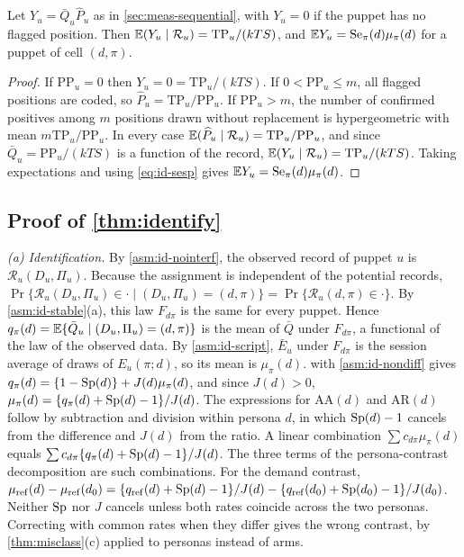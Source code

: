 \begin{lemma}\label{lem:seq-unbiased}
Let $Y_u=\bar Q_u\widehat P_u$ as in \cref{sec:meas-sequential}, with $Y_u=0$ if the puppet has no flagged position. Then $\mathbb{E}(Y_u\mid\mathcal R_u)=\mathrm{TP}_u/(kTS)$, and $\mathbb{E} Y_u=\mathrm{Se}_\pi(d)\mu_\pi(d)$ for a puppet of cell $(d,\pi)$.
\end{lemma}

\begin{proof}
If $\mathrm{PP}_u=0$ then $Y_u=0=\mathrm{TP}_u/(kTS)$. If $0<\mathrm{PP}_u\le m$, all flagged positions are coded, so $\widehat P_u=\mathrm{TP}_u/\mathrm{PP}_u$. If $\mathrm{PP}_u>m$, the number of confirmed positives among $m$ positions drawn without replacement is hypergeometric with mean $m\mathrm{TP}_u/\mathrm{PP}_u$. In every case $\mathbb{E}(\widehat P_u\mid\mathcal R_u)=\mathrm{TP}_u/\mathrm{PP}_u$, and since $\bar Q_u=\mathrm{PP}_u/(kTS)$ is a function of the record, $\mathbb{E}(Y_u\mid\mathcal R_u)=\mathrm{TP}_u/(kTS)$. Taking expectations and using \eqref{eq:id-sesp} gives $\mathbb{E} Y_u=\mathrm{Se}_\pi(d)\mu_\pi(d)$.
\end{proof}

\subsection{Proof of \texorpdfstring{\cref{thm:identify}}{the identification theorem}}\label{app:pf-identify}

\emph{(a) Identification.} By \cref{asm:id-nointerf}, the observed record of puppet $u$ is $\mathcal R_u(D_u,\Pi_u)$. Because the assignment is independent of the potential records, $\Pr\{\mathcal R_u(D_u,\Pi_u)\in\cdot\mid(D_u,\Pi_u)=(d,\pi)\}=\Pr\{\mathcal R_u(d,\pi)\in\cdot\}$. By \cref{asm:id-stable}(a), this law $F_{d\pi}$ is the same for every puppet. Hence $q_\pi(d)=\mathbb{E}\{\bar Q_u\mid(D_u,\Pi_u)=(d,\pi)\}$ is the mean of $\bar Q$ under $F_{d\pi}$, a functional of the law of the observed data. By \cref{asm:id-script}, $\bar E_u$ under $F_{d\pi}$ is the session average of draws of $E_u(\pi;d)$, so its mean is $\mu_\pi(d)$.  with \cref{asm:id-nondiff} gives $q_\pi(d)=\{1-\mathrm{Sp}(d)\}+J(d)\mu_\pi(d)$, and since $J(d)>0$, $\mu_\pi(d)=\{q_\pi(d)+\mathrm{Sp}(d)-1\}/J(d)$. The expressions for $\mathrm{AA}(d)$ and $\mathrm{AR}(d)$ follow by subtraction and division within persona $d$, in which $\mathrm{Sp}(d)-1$ cancels from the difference and $J(d)$ from the ratio. A linear combination $\sum c_{d\pi}\mu_\pi(d)$ equals $\sum c_{d\pi}\{q_\pi(d)+\mathrm{Sp}(d)-1\}/J(d)$. The three terms of the persona-contrast decomposition are such combinations. For the demand contrast, $\mu_{\mathrm{ref}}(d)-\mu_{\mathrm{ref}}(d_0)=\{q_{\mathrm{ref}}(d)+\mathrm{Sp}(d)-1\}/J(d)-\{q_{\mathrm{ref}}(d_0)+\mathrm{Sp}(d_0)-1\}/J(d_0)$. Neither $\mathrm{Sp}$ nor $J$ cancels unless both rates coincide across the two personas. Correcting with common rates when they differ gives the wrong contrast, by \cref{thm:misclass}(c) applied to personas instead of arms.

